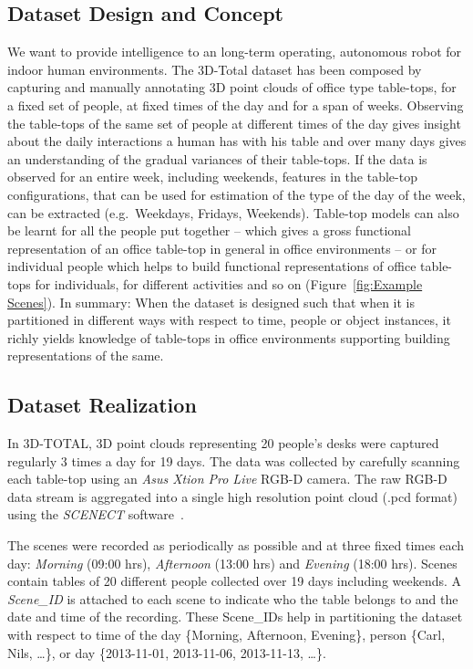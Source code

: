 \documentclass[letterpaper, 10 pt, conference]{ieeeconf}  %
\begin{document}
\subsection{Dataset Design and Concept}
\label{ssec:Dataset Design and Concept}
We want to provide intelligence to an long-term operating, autonomous robot for indoor human environments. The 3D-Total
dataset has been composed by capturing and manually annotating 3D point clouds of office type table-tops, for a fixed set of 
people, at fixed times of the 
day and for a span of weeks. Observing the table-tops of the same set of people at different times of the day gives insight about the daily 
interactions a human has with his table and over many days gives an understanding of the gradual variances of their table-tops. If the data 
is observed for an entire week, including weekends, features in the table-top configurations, that can be used for estimation of the type of 
the day of the week, can be extracted (e.g.\ Weekdays, Fridays, Weekends). Table-top models can also be learnt for all the people put 
together -- which gives a gross functional representation of an office table-top in general in office environments -- or for individual 
people which helps to build functional representations of office table-tops for individuals, for different activities and so on 
(Figure~\ref{fig:Example Scenes}). 
In summary: When the dataset is designed such that when it is partitioned in different ways with respect to time, people or object instances, it richly yields knowledge 
of table-tops in office environments supporting building representations of the same.

\subsection{Dataset Realization}
\label{ssec:Dataset Realization}
In 3D-TOTAL, 3D point clouds representing 20 people's desks were captured regularly 3 times a day for 19 days. The data was collected by 
carefully scanning each table-top using an \textit{Asus Xtion Pro Live} RGB-D camera. The raw RGB-D data stream is aggregated into a single 
high resolution point cloud (.pcd format) using the \textit{SCENECT} software~\cite{Buerkler:Online2012}.

The scenes were recorded as periodically as possible and at three fixed times each day: \emph{Morning} (09:00 hrs), \emph{Afternoon} (13:00 
hrs) and \emph{Evening} (18:00 hrs). Scenes contain tables of 20 different people collected over 19 days including weekends. 
A \textit{Scene\_ID} is attached to each scene to indicate who the table belongs to and the date and time of the recording. These Scene\_IDs help in partitioning the dataset with respect to time of the day \{Morning, Afternoon, Evening\}, person \{Carl, Nils, \dots\}, or day \{2013-11-01, 2013-11-06, 2013-11-13, \dots\}.
\end{document}
